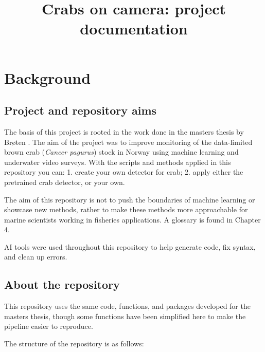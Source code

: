 \documentclass[
]{book}
\title{Crabs on camera: project documentation}
\author{}
\date{\vspace{-2.5em}}
\begin{document}
\maketitle

{
\setcounter{tocdepth}{1}
\tableofcontents
}
\chapter{Background}\label{background}

\section{Project and repository aims}\label{project-and-repository-aims}

The basis of this project is rooted in the work done in the masters thesis by Brøten \citeyearpar{broten_crabs_2026}. The aim of the project was to improve monitoring of the data-limited brown crab (\emph{Cancer pagurus}) stock in Norway using machine learning and underwater video surveys. With the scripts and methods applied in this repository you can: 1. create your own detector for crab; 2. apply either the pretrained crab detector, or your own.

The aim of this repository is not to push the boundaries of machine learning or showcase new methods, rather to make these methods more approachable for marine scientists working in fisheries applications. A glossary is found in Chapter 4.

AI tools were used throughout this repository to help generate code, fix syntax, and clean up errors.

\section{About the repository}\label{about-the-repository}

This repository uses the same code, functions, and packages developed for the masters thesis, though some functions have been simplified here to make the pipeline easier to reproduce.

The structure of the repository is as follows:
\end{document}
